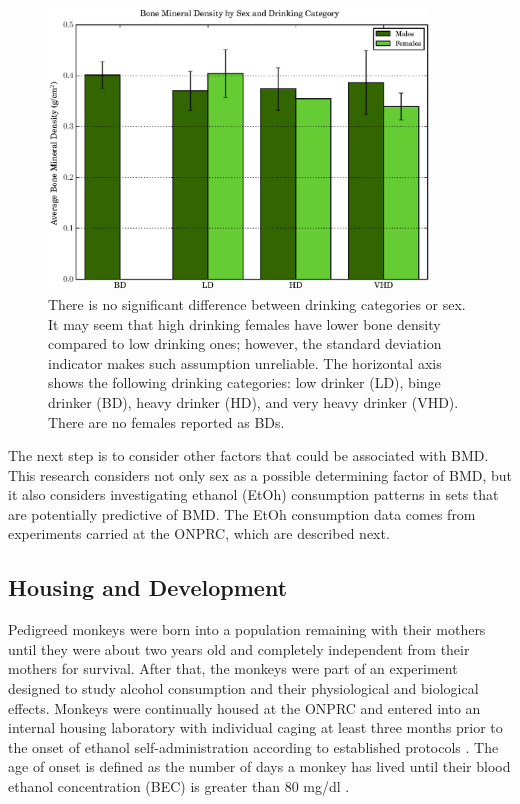\documentclass{bmcart}
\begin{document}
\begin{figure}[t]
    \caption{
             There is no significant difference between drinking categories
             or sex. It may seem that high drinking females have lower bone 
             density compared to low drinking ones; however, the standard
	     deviation indicator makes such assumption unreliable. The
             horizontal axis shows the following drinking categories: 
             low drinker (LD), binge drinker (BD), heavy drinker (HD), 
             and very heavy drinker (VHD). There are no females reported as
             BDs.}
\label{fig:bmdsexcat}
    \includegraphics[width=0.9\textwidth]{data_b_c_s_bmd.eps}
\end{figure}

The next step is to consider other factors that could be associated with BMD.
This research considers not only sex as a possible determining factor of BMD, 
but it also considers investigating ethanol (EtOh) consumption patterns
in sets that are potentially predictive of BMD. The EtOh consumption data comes
from experiments carried at the ONPRC, which are described next.

\subsection*{Housing and Development}

Pedigreed monkeys were born into a population remaining with their mothers
until they were about two years old and completely independent from their
mothers for survival. After that, the monkeys were part of an experiment
designed to study alcohol consumption and their physiological and biological 
effects. Monkeys were continually housed at the ONPRC and entered into an internal
housing laboratory with individual caging at
least three months prior to the onset of ethanol self-administration according
to established protocols \cite{daunais2014monkey}. The age of onset is defined as
the number of days a monkey has lived until their blood ethanol concentration 
(BEC) is greater than 80 mg/dl \cite{li2007alcohol,dawson2008age}.
\end{document}
